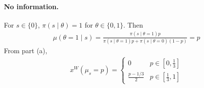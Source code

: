 \documentclass[11pt]{exam}
\begin{document}
\begin{questions}
\begin{parts}
        \paragraph{No information.} For $s\in\{0\}$, $\pi(s\mid\theta) = 1$ for $\theta\in\{0,1\}$. Then
        \begin{align*}
            \mu(\theta=1\mid s) = \frac{\pi(s\mid\theta=1)p}{\pi(s\mid\theta=1)p + \pi(s\mid\theta=0)(1-p)} = p
        \end{align*}
        From part (a),
        \begin{align*}
            x^W(\mu_s=p) = \begin{cases}
                0 & p\in[0,\tfrac13]\\
                \frac{p-1/3}{2} & p\in[\tfrac13, 1]
            \end{cases}
        \end{align*}


\end{parts}
\end{questions}
\end{document}
